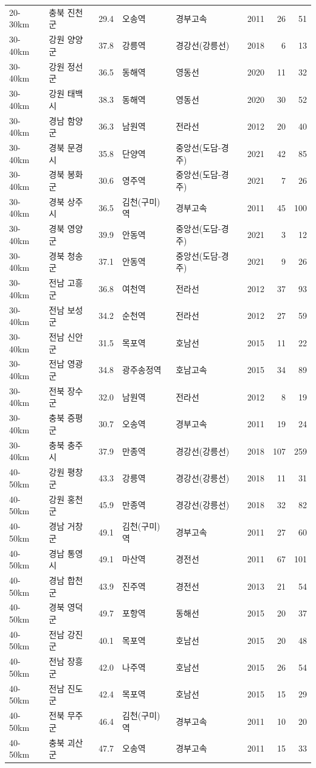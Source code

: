 \begin{tabular}{llrllrrr}
20-30km & 충북 진천군 & 29.4 & 오송역 & 경부고속 & 2011 & 26 & 51\\
30-40km & 강원 양양군 & 37.8 & 강릉역 & 경강선(강릉선) & 2018 & 6 & 13\\
30-40km & 강원 정선군 & 36.5 & 동해역 & 영동선 & 2020 & 11 & 32\\
30-40km & 강원 태백시 & 38.3 & 동해역 & 영동선 & 2020 & 30 & 52\\
30-40km & 경남 함양군 & 36.3 & 남원역 & 전라선 & 2012 & 20 & 40\\
30-40km & 경북 문경시 & 35.8 & 단양역 & 중앙선(도담-경주) & 2021 & 42 & 85\\
30-40km & 경북 봉화군 & 30.6 & 영주역 & 중앙선(도담-경주) & 2021 & 7 & 26\\
30-40km & 경북 상주시 & 36.5 & 김천(구미)역 & 경부고속 & 2011 & 45 & 100\\
30-40km & 경북 영양군 & 39.9 & 안동역 & 중앙선(도담-경주) & 2021 & 3 & 12\\
30-40km & 경북 청송군 & 37.1 & 안동역 & 중앙선(도담-경주) & 2021 & 9 & 26\\
30-40km & 전남 고흥군 & 36.8 & 여천역 & 전라선 & 2012 & 37 & 93\\
30-40km & 전남 보성군 & 34.2 & 순천역 & 전라선 & 2012 & 27 & 59\\
30-40km & 전남 신안군 & 31.5 & 목포역 & 호남선 & 2015 & 11 & 22\\
30-40km & 전남 영광군 & 34.8 & 광주송정역 & 호남고속 & 2015 & 34 & 89\\
30-40km & 전북 장수군 & 32.0 & 남원역 & 전라선 & 2012 & 8 & 19\\
30-40km & 충북 증평군 & 30.7 & 오송역 & 경부고속 & 2011 & 19 & 24\\
30-40km & 충북 충주시 & 37.9 & 만종역 & 경강선(강릉선) & 2018 & 107 & 259\\
40-50km & 강원 평창군 & 43.3 & 강릉역 & 경강선(강릉선) & 2018 & 11 & 31\\
40-50km & 강원 홍천군 & 45.9 & 만종역 & 경강선(강릉선) & 2018 & 32 & 82\\
40-50km & 경남 거창군 & 49.1 & 김천(구미)역 & 경부고속 & 2011 & 27 & 60\\
40-50km & 경남 통영시 & 49.1 & 마산역 & 경전선 & 2011 & 67 & 101\\
40-50km & 경남 합천군 & 43.9 & 진주역 & 경전선 & 2013 & 21 & 54\\
40-50km & 경북 영덕군 & 49.7 & 포항역 & 동해선 & 2015 & 20 & 37\\
40-50km & 전남 강진군 & 40.1 & 목포역 & 호남선 & 2015 & 20 & 48\\
40-50km & 전남 장흥군 & 42.0 & 나주역 & 호남선 & 2015 & 26 & 54\\
40-50km & 전남 진도군 & 42.4 & 목포역 & 호남선 & 2015 & 15 & 29\\
40-50km & 전북 무주군 & 46.4 & 김천(구미)역 & 경부고속 & 2011 & 10 & 20\\
40-50km & 충북 괴산군 & 47.7 & 오송역 & 경부고속 & 2011 & 15 & 33\\
\bottomrule
\end{tabular}
